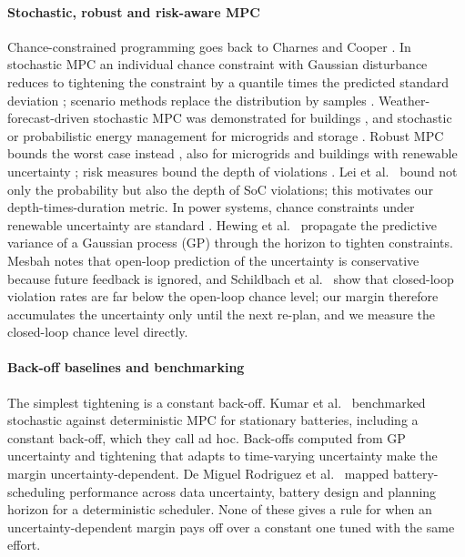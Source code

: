 \documentclass[a4paper,fleqn]{cas-dc}
\begin{document}
\paragraph{Stochastic, robust and risk-aware MPC} Chance-constrained programming goes back to Charnes and Cooper \cite{charnes1959chance}. In stochastic MPC an individual chance constraint with Gaussian disturbance reduces to tightening the constraint by a quantile times the predicted standard deviation \cite{mesbah2016stochastic,farina2016stochastic,lorenzen2017constraint,kouvaritakis2016model}; scenario methods replace the distribution by samples \cite{calafiore2006scenario,schildbach2014scenario}. Weather-forecast-driven stochastic MPC was demonstrated for buildings \cite{oldewurtel2012use,oldewurtel2014stochastic,parisio2013scenario,parisio2014implementation}, and stochastic or probabilistic energy management for microgrids \cite{velarde2017comparison,silvente2018rolling,cheng2020probabilistic,wu2021mpcev} and storage \cite{arnold2011mpc,kumar2018stochastic}. Robust MPC bounds the worst case instead \cite{bemporad1999robust,mayne2005robust}, also for microgrids and buildings with renewable uncertainty \cite{zhang2013robust,hu2024improved}; risk measures bound the depth of violations \cite{rockafellar2000optimization,narayan2017risk}. Lei et al.\ \cite{lei2021optimal} bound not only the probability but also the depth of SoC violations; this motivates our depth-times-duration metric. In power systems, chance constraints under renewable uncertainty are standard \cite{bienstock2014chance,roald2018chance}. Hewing et al.\ \cite{hewing2020cautious,hewing2020learning} propagate the predictive variance of a Gaussian process (GP) through the horizon to tighten constraints. Mesbah \cite{mesbah2016stochastic} notes that open-loop prediction of the uncertainty is conservative because future feedback is ignored, and Schildbach et al.\ \cite{schildbach2014scenario} show that closed-loop violation rates are far below the open-loop chance level; our margin therefore accumulates the uncertainty only until the next re-plan, and we measure the closed-loop chance level directly.

\paragraph{Back-off baselines and benchmarking} The simplest tightening is a constant back-off. Kumar et al.\ \cite{kumar2019benchmarking} benchmarked stochastic against deterministic MPC for stationary batteries, including a constant back-off, which they call ad hoc. Back-offs computed from GP uncertainty \cite{bradford2020backoffs} and tightening that adapts to time-varying uncertainty \cite{bujarbaruah2021adaptive} make the margin uncertainty-dependent. De Miguel Rodriguez et al.\ \cite{demiguel2026mapping} mapped battery-scheduling performance across data uncertainty, battery design and planning horizon for a deterministic scheduler. None of these gives a rule for when an uncertainty-dependent margin pays off over a constant one tuned with the same effort.
\end{document}

